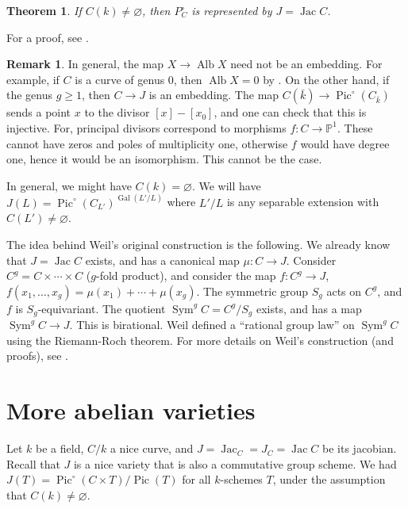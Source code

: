 \documentclass{article}
\DeclareMathOperator{\gal}{Gal}
\DeclareMathOperator{\jac}{Jac}
\DeclareMathOperator{\pic}{Pic}
\newtheorem{theorem}[subsection]{Theorem}
\theoremstyle{definition}
\newtheorem{remark}[subsection]{Remark}
\begin{document}
\begin{theorem}
If $C(k)\ne \varnothing$, then $P_C^\circ$ is represented by $J=\jac C$.
\end{theorem}

For a proof, see \cite[III.1.2]{mi}. 

\begin{remark}
In general, the map $X\to \operatorname{Alb} X$ need not be an embedding. 
For example, if $C$ is a curve of genus $0$, then $\operatorname{Alb} X=0$ by 
\cite[I.3.9]{mi}. On the other hand, if the genus $g\geqslant 1$, then 
$C\to J$ is an embedding. The map $C(\bar k)\to \pic^\circ(C_{\bar k})$ sends 
a point $x$ to the divisor $[x]-[x_0]$, and one can check that this is 
injective. For, principal divisors correspond to morphisms 
$f:C\to\mathbb{P}^1$. These cannot have zeros and poles of multiplicity one, 
otherwise $f$ would have degree one, hence it would be an isomorphism. This 
cannot be the case. 
\end{remark}

In general, we might have $C(k)=\varnothing$. We will have 
$J(L)=\pic^\circ(C_{L'})^{\gal(L'/L)}$ where $L'/L$ is any separable extension 
with $C(L')\ne\varnothing$. 

The idea behind Weil's original construction is the following. We already 
know that $J=\jac C$ exists, and has a canonical map $\mu:C\to J$. Consider 
$C^g=C\times\cdots\times C$ ($g$-fold product), and consider the map 
$f:C^g\to J$, $f(x_1,\dotsc,x_g)=\mu(x_1)+\cdots+\mu(x_g)$. The symmetric 
group $S_g$ acts on $C^g$, and $f$ is $S_g$-equivariant. The quotient 
$\operatorname{Sym}^g C = C^g/S_g$ exists, and has a map 
$\operatorname{Sym}^g C\to J$. This is birational. Weil defined a ``rational 
group law'' on $\operatorname{Sym}^g C$ using the Riemann-Roch theorem. For 
more details on Weil's construction (and proofs), see \cite[III.7]{mi}. 










\section{More abelian varieties}

Let $k$ be a field, $C/k$ a nice curve, and $J=\jac_C = J_C = \jac C$ be its 
jacobian. Recall that $J$ is a nice variety that is also a commutative group 
scheme. We had $J(T) = \pic^\circ(C\times T)/\pic(T)$ for all $k$-schemes $T$, 
under the assumption that $C(k)\ne \varnothing$. 
\end{document}
